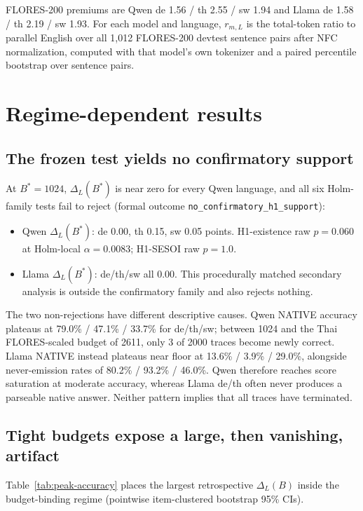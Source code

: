 \documentclass[11pt]{article}
\begin{document}
FLORES-200 premiums are Qwen de 1.56 / th 2.55 / sw 1.94 and Llama de 1.58 / th 2.19 / sw 1.93. For each model and language, \(r_{m,L}\) is the total-token ratio to parallel English over all 1,012 FLORES-200 devtest sentence pairs after NFC normalization, computed with that model's own tokenizer and a paired percentile bootstrap over sentence pairs.

\section{Regime-dependent results}
\label{sec:results}

\subsection{The frozen test yields no confirmatory support}
\label{subsec:frozen}

At \(B^*=1024\), \(\Delta_L(B^*)\) is near zero for every Qwen language, and all six Holm-family tests fail to reject (formal outcome \texttt{no\_confirmatory\_h1\_support}):
\begin{itemize}
    \item Qwen \(\Delta_L(B^*)\): de 0.00, th 0.15, sw 0.05 points. H1-existence raw \(p=0.060\) at Holm-local \(\alpha=0.0083\); H1-SESOI raw \(p=1.0\).
    \item Llama \(\Delta_L(B^*)\): de/th/sw all 0.00. This procedurally matched secondary analysis is outside the confirmatory family and also rejects nothing.
\end{itemize}

The two non-rejections have different descriptive causes. Qwen NATIVE accuracy plateaus at 79.0\% / 47.1\% / 33.7\% for de/th/sw; between 1024 and the Thai FLORES-scaled budget of 2611, only 3 of 2000 traces become newly correct. Llama NATIVE instead plateaus near floor at 13.6\% / 3.9\% / 29.0\%, alongside never-emission rates of 80.2\% / 93.2\% / 46.0\%. Qwen therefore reaches score saturation at moderate accuracy, whereas Llama de/th often never produces a parseable native answer. Neither pattern implies that all traces have terminated.

\subsection{Tight budgets expose a large, then vanishing, artifact}
\label{subsec:tight}

Table~\ref{tab:peak-accuracy} places the largest retrospective \(\Delta_L(B)\) inside the budget-binding regime (pointwise item-clustered bootstrap 95\% CIs).
\end{document}
